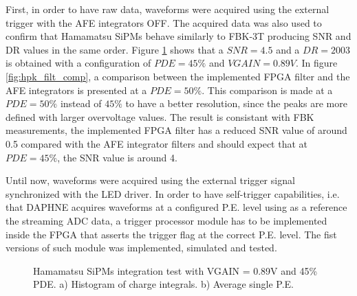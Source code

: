 First, in order to have raw data, waveforms were acquired using the external trigger with the AFE integrators OFF. The acquired data was also used to confirm that Hamamatsu SiPMs behave similarly to FBK-3T producing SNR and DR values in the same order. Figure \ref{fig:hpk_hist_avg} shows that a $SNR = 4.5$ and a $DR = 2003$ is obtained with a configuration of $PDE = 45\%$ and $VGAIN = 0.89V$. In figure \ref{fig:hpk_filt_comp}, a comparison between the implemented FPGA filter and the AFE integrators is presented at a $PDE = 50\%$. This comparison is made at a $PDE = 50\%$ instead of $45\%$ to have a better resolution, since the peaks are more defined with larger overvoltage values. The result is consistant with FBK measurements, the implemented FPGA filter has a reduced SNR value of around 0.5 compared with the AFE integrator filters and should expect that at $PDE = 45\%$, the SNR value is around 4.   

Until now, waveforms were acquired using the external trigger signal synchronized with the LED driver. In order to have self-trigger capabilities, i.e. that DAPHNE acquires waveforms at a configured P.E. level using as a reference the streaming ADC data, a trigger processor module has to be implemented inside the FPGA that asserts the trigger flag at the correct P.E. level. The fist versions of such module was implemented, simulated and tested. 

\begin{figure}[h]
\centering
{}
\caption[]{Hamamatsu SiPMs integration test with VGAIN = 0.89V and 45\% PDE.  a) Histogram of charge integrals. b) Average single P.E.}
\label{fig:hpk_hist_avg}
\end{figure}

